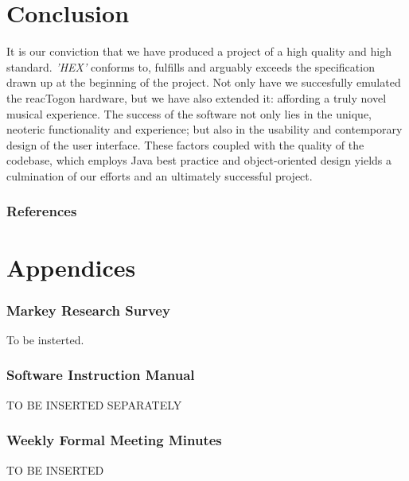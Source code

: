 \documentclass[10pt,a4paper]{article}
\begin{document}
\part{Conclusion}
It is our conviction that we have produced a project of a high quality and high standard. \textit{'HEX'} conforms to, fulfills and arguably exceeds the specification drawn up at the beginning of the project. Not only have we succesfully emulated the reacTogon hardware, but we have also extended it: affording a truly novel musical experience. The success of the software not only lies in the unique, neoteric functionality and experience; but also in the usability and contemporary design of the user interface. These factors coupled with the quality of the codebase, which employs Java best practice and object-oriented design yields a culmination of our efforts and an ultimately successful project.
\section{References}


\pagebreak

\part{Appendices}


\section{Markey Research Survey}
To be insterted.
\pagebreak

\section{Software Instruction Manual}
TO BE INSERTED SEPARATELY

\pagebreak
\section{Weekly Formal Meeting Minutes}
TO BE INSERTED
\end{document}
